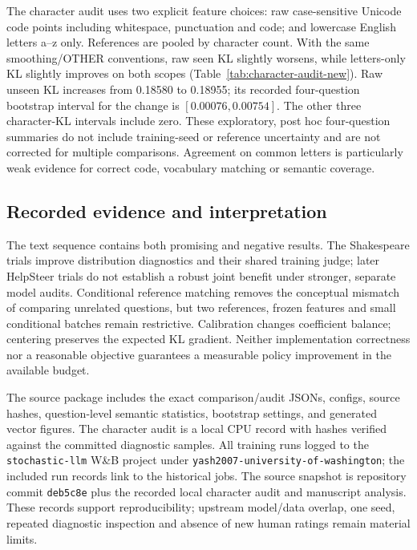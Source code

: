 The character audit uses two explicit feature choices: raw
case-sensitive Unicode code points including whitespace, punctuation
and code; and lowercase English letters a--z only. References are
pooled by character count. With the same smoothing/OTHER conventions,
raw seen KL slightly worsens, while letters-only KL slightly improves
on both scopes (Table~\ref{tab:character-audit-new}). Raw unseen KL
increases from 0.18580 to 0.18955; its recorded four-question bootstrap
interval for the change is $[0.00076,0.00754]$. The other three
character-KL intervals include zero. These exploratory, post hoc
four-question summaries do not include training-seed or reference
uncertainty and are not corrected for multiple comparisons. Agreement
on common letters is particularly weak evidence for correct code,
vocabulary matching or semantic coverage.


\subsection{Recorded evidence and interpretation}
The text sequence contains both promising and negative results. The
Shakespeare trials improve distribution diagnostics and their shared
training judge; later HelpSteer trials do not establish a robust joint
benefit under stronger, separate model audits. Conditional reference
matching removes the conceptual mismatch of comparing unrelated questions,
but two references, frozen features and small conditional batches remain
restrictive. Calibration changes coefficient balance; centering preserves
the expected KL gradient. Neither implementation correctness nor a
reasonable objective guarantees a measurable policy improvement in the
available budget.

The source package includes the exact comparison/audit JSONs, configs,
source hashes, question-level semantic statistics, bootstrap settings,
and generated vector figures. The character audit is a local CPU record
with hashes verified against the committed diagnostic samples. All
training runs logged to the \texttt{stochastic-llm} W\&B project under
\texttt{yash2007-university-of-washington}; the included run records link
to the historical jobs. The source snapshot is repository commit
\texttt{deb5c8e} plus the recorded local character audit and manuscript
analysis. These records support reproducibility; upstream model/data
overlap, one seed, repeated diagnostic inspection and absence of new
human ratings remain material limits.
